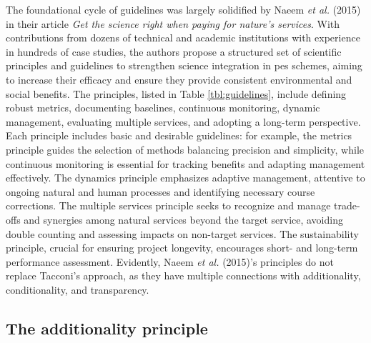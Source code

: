 \documentclass[./main_en.tex]{subfiles}
\begin{document}
\par The foundational cycle of guidelines was largely solidified by Naeem \textit{et al.} (2015) \cite{Naeem2015b} in their article \textit{Get the science right when paying for nature’s services}. With contributions from dozens of technical and academic institutions with experience in hundreds of case studies, the authors propose a structured set of scientific principles and guidelines to strengthen science integration in \acrshort{pes} schemes, aiming to increase their efficacy and ensure they provide consistent environmental and social benefits. The principles, listed in Table \ref{tbl:guidelines}, include defining robust metrics, documenting baselines, continuous monitoring, dynamic management, evaluating multiple services, and adopting a long-term perspective. Each principle includes basic and desirable guidelines: for example, the metrics principle guides the selection of methods balancing precision and simplicity, while continuous monitoring is essential for tracking benefits and adapting management effectively. The dynamics principle emphasizes adaptive management, attentive to ongoing natural and human processes and identifying necessary course corrections. The multiple services principle seeks to recognize and manage trade-offs and synergies among natural services beyond the target service, avoiding double counting and assessing impacts on non-target services. The sustainability principle, crucial for ensuring project longevity, encourages short- and long-term performance assessment. Evidently, Naeem \textit{et al.} (2015)’s principles do not replace Tacconi’s approach, as they have multiple connections with additionality, conditionality, and transparency.

\subsection{The additionality principle}
\end{document}
